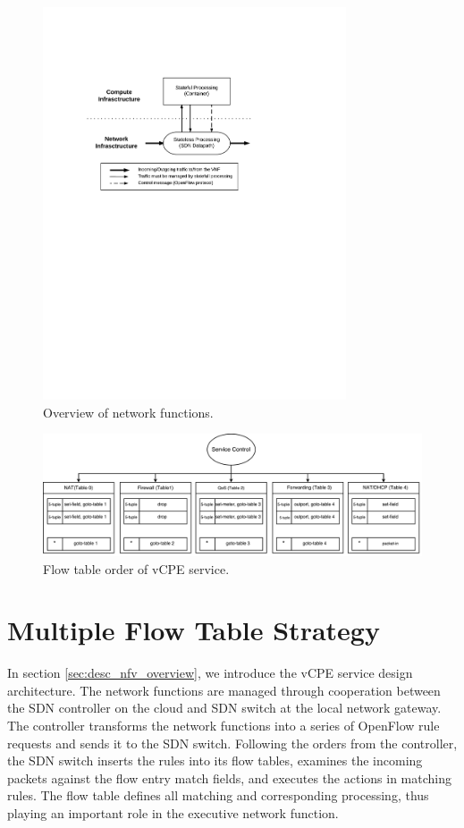 \begin{figure}[!t]
\centering
\includegraphics[width=0.8\textwidth]{./fig/nfv_overview.pdf}
\caption{Overview of network functions.}
\label{fig:nfv_overview}
\end{figure}

\begin{figure}[!t]
\centering
\includegraphics[width=\textwidth]{./fig/mft_table_overview}
\caption{Flow table order of vCPE service.}
\label{fig:mft_table_overview}
\end{figure}



\section{Multiple Flow Table Strategy} \label{sec:multi_flow_table_strategy}
In section \ref{sec:desc_nfv_overview}, we introduce the vCPE service design architecture. The network functions are managed through cooperation between the SDN controller on the cloud and SDN switch at the local network gateway. The controller transforms the network functions into a series of OpenFlow rule requests and sends it to the SDN switch. Following the orders from the controller, the SDN switch inserts the rules into its flow tables, examines the incoming packets against the flow entry match fields, and executes the actions in matching rules. The flow table \cite{sdn-ft} defines all matching and corresponding processing, thus playing an important role in the executive network function.

